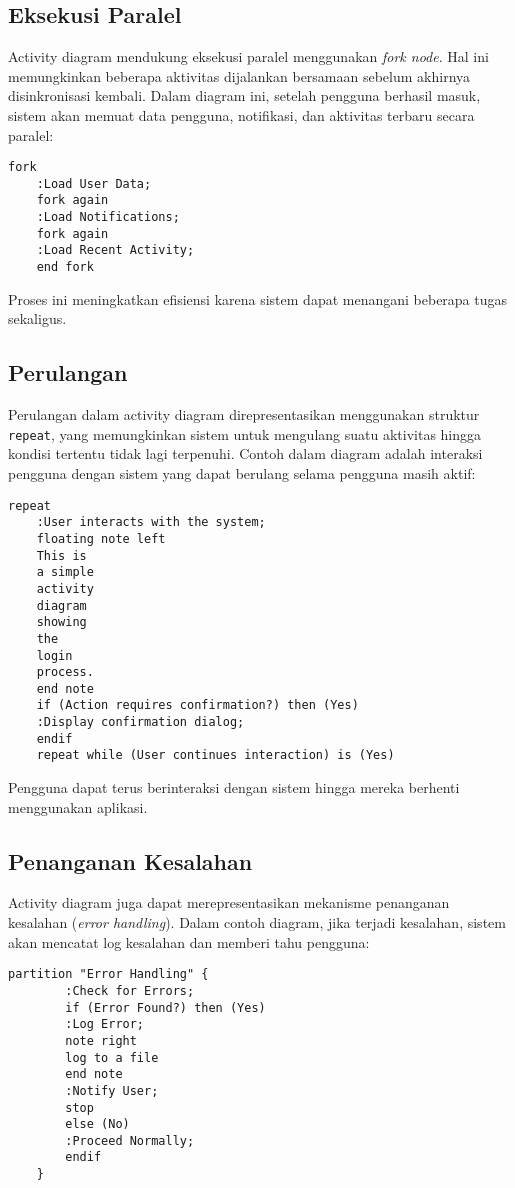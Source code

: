 \subsection{Eksekusi Paralel}
Activity diagram mendukung eksekusi paralel menggunakan \textit{fork node}. Hal ini memungkinkan beberapa aktivitas dijalankan bersamaan sebelum akhirnya disinkronisasi kembali. Dalam diagram ini, setelah pengguna berhasil masuk, sistem akan memuat data pengguna, notifikasi, dan aktivitas terbaru secara paralel:

\begin{lstlisting}[language=puml]
	fork
	:Load User Data;
	fork again
	:Load Notifications;
	fork again
	:Load Recent Activity;
	end fork
\end{lstlisting}

Proses ini meningkatkan efisiensi karena sistem dapat menangani beberapa tugas sekaligus.

\subsection{Perulangan}
Perulangan dalam activity diagram direpresentasikan menggunakan struktur \texttt{repeat}, yang memungkinkan sistem untuk mengulang suatu aktivitas hingga kondisi tertentu tidak lagi terpenuhi. Contoh dalam diagram adalah interaksi pengguna dengan sistem yang dapat berulang selama pengguna masih aktif:

\begin{lstlisting}[language=puml]
	repeat
	:User interacts with the system;
	floating note left
	This is 
	a simple 
	activity 
	diagram
	showing 
	the 
	login 
	process.
	end note
	if (Action requires confirmation?) then (Yes)
	:Display confirmation dialog;
	endif
	repeat while (User continues interaction) is (Yes)
\end{lstlisting}

Pengguna dapat terus berinteraksi dengan sistem hingga mereka berhenti menggunakan aplikasi.

\subsection{Penanganan Kesalahan}
Activity diagram juga dapat merepresentasikan mekanisme penanganan kesalahan (\textit{error handling}). Dalam contoh diagram, jika terjadi kesalahan, sistem akan mencatat log kesalahan dan memberi tahu pengguna:

\begin{lstlisting}[language=puml]
	partition "Error Handling" {
		:Check for Errors;
		if (Error Found?) then (Yes)
		:Log Error;
		note right
		log to a file
		end note
		:Notify User;
		stop
		else (No)
		:Proceed Normally;
		endif
	}
\end{lstlisting}

